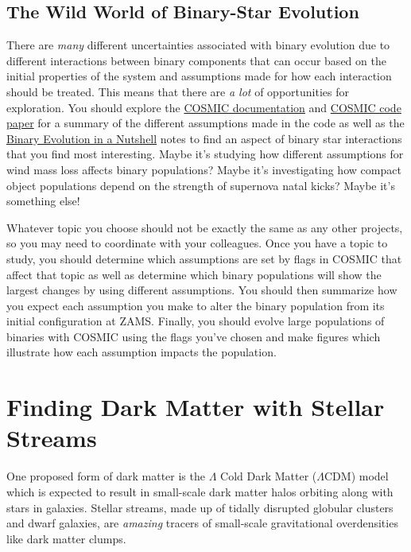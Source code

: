 \documentclass[10pt]{extarticle}
\begin{document}
\subsection{The Wild World of Binary-Star Evolution}
There are \emph{many} different uncertainties associated with binary evolution
due to different interactions between binary components that can occur based on
the initial properties of the system and assumptions made for how each
interaction should be treated. This means that there are \emph{a lot} of
opportunities for exploration. You should explore the
\href{https://cosmic-popsynth.github.io/COSMIC/}{COSMIC documentation} and
\href{https://ui.adsabs.harvard.edu/abs/2020ApJ...898...71B/abstract}{COSMIC
code paper} for a summary of the different assumptions made in the code as well
as the
\href{https://www.astro.ru.nl/~sluys/Binaries/files/BinaryEvolutionNutshell_letter.pdf}{Binary
Evolution in a Nutshell} notes to find an aspect of binary star interactions
that you find most interesting. Maybe it's studying how different assumptions
for wind mass loss affects binary populations? Maybe it's investigating how
compact object populations depend on the strength of supernova natal kicks?
Maybe it's something else!

Whatever topic you choose should not be exactly the same as any other projects,
so you may need to coordinate with your colleagues. Once you have a topic to
study, you should determine which assumptions are set by flags in COSMIC that
affect that topic as well as determine which binary populations will show the
largest changes by using different assumptions. You should then summarize how
you expect each assumption you make to alter the binary population from its
initial configuration at ZAMS. Finally, you should evolve large populations of
binaries with COSMIC using the flags you've chosen and make figures which
illustrate how each assumption impacts the population. 


\section{Finding Dark Matter with Stellar Streams}
One proposed form of dark matter is the $\Lambda$ Cold Dark Matter
($\Lambda$CDM) model which is expected to result in small-scale dark matter
halos orbiting along with stars in galaxies. Stellar streams, made up of tidally
disrupted globular clusters and dwarf galaxies, are \emph{amazing} tracers of
small-scale gravitational overdensities like dark matter clumps.
\end{document}
